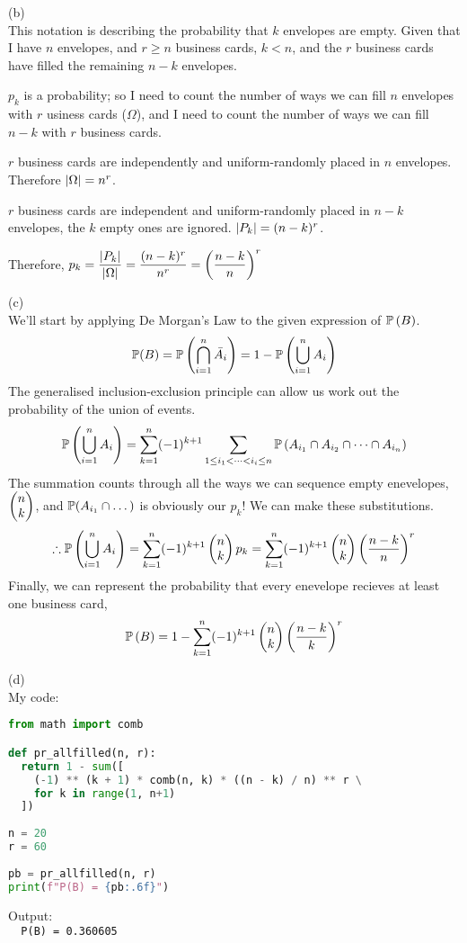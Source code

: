 \documentclass[a4paper,12pt]{report}
\begin{document}
\sol (b) \\
This notation is describing the probability that $k$ envelopes are empty. Given that I have $n$ envelopes, and $r\geq n$ business cards, $k < n$, and the $r$ business cards have filled the remaining $n-k$ envelopes. 

$p_k$ is a probability; so I need to count the number of ways we can fill $n$ envelopes with $r$ usiness cards ($\Omega$), and I need to count the number of ways we can fill $n-k$ with $r$ business cards. 

$r$ business cards are independently and uniform-randomly placed in $n$ envelopes. Therefore $\left| \Omega \right| = n^r$. 

$r$ business cards are independent and uniform-randomly placed in $n-k$ envelopes, the $k$ empty ones are ignored. $\left| P_k \right|=(n-k)^r$.

Therefore, $\displaystyle{p_k = \frac{\left| P_k \right|}{\left| \Omega \right|} = \frac{(n-k)^r}{n^r} = \left(\frac{n-k}{n} \right)^r}$

\newpage
\sol (c) \\
We'll start by applying De Morgan's Law to the given expression of $\mathbb{P}\left( B \right)$.
$$
  \mathbb{P}(B) = \mathbb{P}\left( \bigcap_{i=1}^{n} \bar{A_i} \right) = 1 - \mathbb{P}\left( \bigcup_{i=1}^{n} A_i \right)
$$
The generalised inclusion-exclusion principle can allow us work out the probability of the union of events.
$$
  \mathbb{P}\left( \bigcup_{i=1}^{n} A_i \right) = \sum_{k=1}^{n} (-1)^{k+1} \sum_{1\leq i_1<\dots<i_i \leq n} \mathbb{P}\left( A_{i_1}\cap A_{i_2}\cap \dots \cap A_{i_n} \right)
$$
The summation counts through all the ways we can sequence empty enevelopes, $\begin{pmatrix} n \\ k \end{pmatrix}$, and $\mathbb{P}(A_{i_1}\cap\dots)$ is obviously our $p_k$! We can make these substitutions.
$$
  \therefore\mathbb{P}\left( \bigcup_{i=1}^{n} A_i \right) = \sum_{k=1}^{n} (-1)^{k+1}\begin{pmatrix} n \\ k \end{pmatrix}p_k = \sum_{k=1}^{n} (-1)^{k+1}\begin{pmatrix} n \\ k \end{pmatrix}\left( \frac{n-k}{n} \right)^r
$$
Finally, we can represent the probability that every enevelope recieves at least one business card,
$$
  \mathbb{P}\left( B \right) = 1 - \sum_{k=1}^{n}(-1)^{k+1} \begin{pmatrix} n \\ k \end{pmatrix}\left( \frac{n-k}{k} \right)^r
$$

\newpage
\sol (d) \\
My code:
\begin{lstlisting}[language=Python]
from math import comb

def pr_allfilled(n, r):
  return 1 - sum([
    (-1) ** (k + 1) * comb(n, k) * ((n - k) / n) ** r \
    for k in range(1, n+1)
  ])
  
n = 20
r = 60
  
pb = pr_allfilled(n, r)
print(f"P(B) = {pb:.6f}")
\end{lstlisting}
Output:\\
\verb|  P(B) = 0.360605| \\
\end{document}
